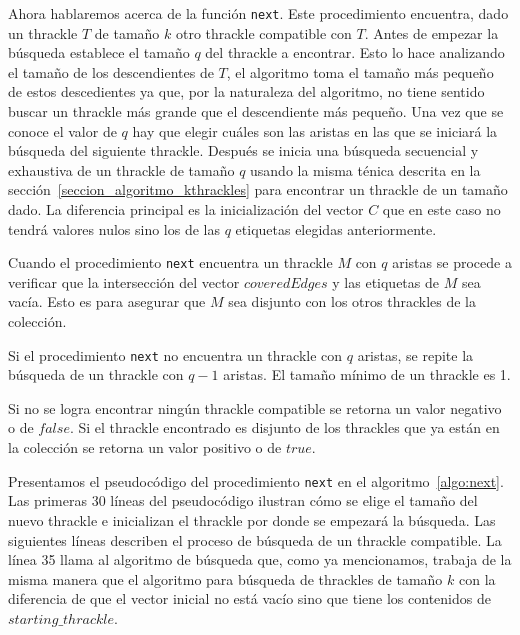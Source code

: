   Ahora hablaremos acerca de la función \texttt{next}. Este procedimiento encuentra, dado un thrackle $T$ de tamaño $k$ otro thrackle compatible con $T$. Antes de empezar la búsqueda establece el tamaño $q$ del thrackle a encontrar. Esto lo hace analizando el tamaño de los descendientes de $T$, el algoritmo toma el tamaño más pequeño de estos descedientes ya que, por la  naturaleza del algoritmo, no tiene sentido buscar un thrackle más grande que el descendiente más pequeño. Una vez que se conoce el valor de $q$ hay que elegir cuáles son las aristas en las que se iniciará la búsqueda del siguiente thrackle. Después se inicia una búsqueda secuencial y exhaustiva de un thrackle de tamaño $q$ usando la misma ténica descrita en la sección~\ref{seccion_algoritmo_kthrackles} para encontrar un thrackle de un tamaño dado. La diferencia principal es la inicialización del vector $C$ que en este caso no tendrá valores nulos sino los de las $q$ etiquetas elegidas anteriormente.

  Cuando el procedimiento \texttt{next} encuentra un thrackle $M$ con $q$ aristas se procede a verificar
  que la intersección del vector $coveredEdges$ y las etiquetas de $M$ sea vacía. Esto es para asegurar que
  $M$ sea disjunto con los otros thrackles de la colección.

  Si el procedimiento \texttt{next} no encuentra un thrackle con $q$ aristas, se repite la búsqueda de un
  thrackle con $q-1$ aristas. El tamaño mínimo de un thrackle es 1.

  Si no se logra encontrar ningún thrackle compatible se retorna un valor negativo o de $false$. Si el
  thrackle encontrado es disjunto de los thrackles que ya están en la colección se retorna un valor
  positivo o de $true$.

  Presentamos el pseudocódigo del procedimiento \texttt{next} en el algoritmo~\ref{algo:next}. Las primeras 30 líneas del pseudocódigo ilustran cómo se elige el tamaño del nuevo thrackle e inicializan el thrackle por donde se empezará la búsqueda. Las siguientes líneas describen el proceso de búsqueda de un thrackle compatible. La línea 35 llama al algoritmo de búsqueda que, como ya mencionamos, trabaja de la misma manera que el algoritmo para búsqueda de thrackles de tamaño $k$ con la diferencia de que el vector inicial no está vacío sino que tiene los contenidos de $starting\_thrackle$.

